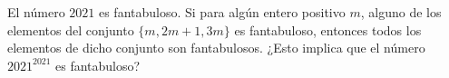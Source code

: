 El número $2021$ es fantabuloso. Si para algún entero positivo $m$, alguno de los elementos del conjunto $\{m, 2m + 1, 3m\}$ es fantabuloso, entonces todos los elementos de dicho conjunto
son fantabulosos. ¿Esto implica que el número $2021^{2021}$ es fantabuloso?